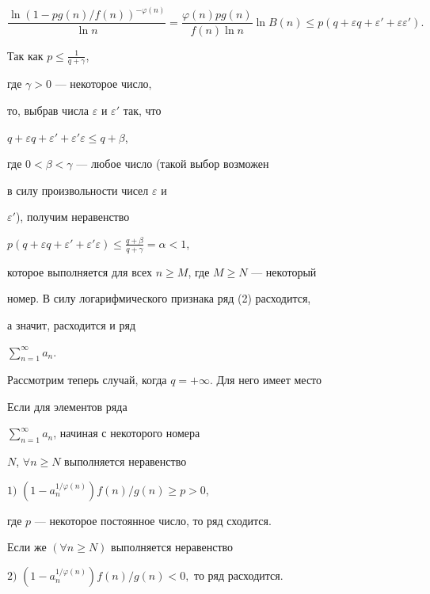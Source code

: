 \begin{pf}
$$


\frac{\ln(1-p g(n)/f(n))^{-\varphi (n)}}{\ln n}


=\frac{\varphi (n)p g(n)}{f(n) \ln n}


\ln B(n)\leq p(q+\varepsilon q+\varepsilon '+\varepsilon \varepsilon ').


$$





Так как $p\leq \frac{1}{q+\gamma}$,


где $\gamma >0$ --- некоторое число,


то, выбрав числа $\varepsilon $ и $\varepsilon '$ так, что


$q+\varepsilon q+


\varepsilon '+\varepsilon ' \varepsilon \leq q+\beta$,


где $0<\beta <\gamma$ --- любое число (такой выбор возможен 


в силу произвольности чисел $\varepsilon $ и


$\varepsilon '$), получим неравенство


$p (q+\varepsilon q +\varepsilon ' +\varepsilon ' \varepsilon ) \leq


\frac{q+\beta}{q+\gamma}=\alpha <1$,


которое выполняется для всех $n \geq M$, где $M\geq N$ --- некоторый


номер. В силу логарифмического признака ряд (2) расходится,


а значит, расходится и ряд


$\sum\limits_{n=1}^{\infty}a_n$.


\end{pf}





Рассмотрим теперь случай, когда $q=+\infty $. Для него имеет место








\begin{thm}


Если для элементов ряда


$\sum\limits_{n=1}^{\infty}a_n$, начиная с некоторого номера


$N$, $\forall n \geq N$ выполняется неравенство





$1)$ $(1-a_n^{1/\varphi (n)})f(n)/g(n)\geq p>0$, 


где $p$ --- некоторое постоянное число, то ряд сходится.





Если же $(\forall n \geq N)$ выполняется неравенство





$2)$ $(1-a_n^{1/ \varphi (n)})


f(n)/g(n)<0, $ то ряд расходится.


\end{thm}








